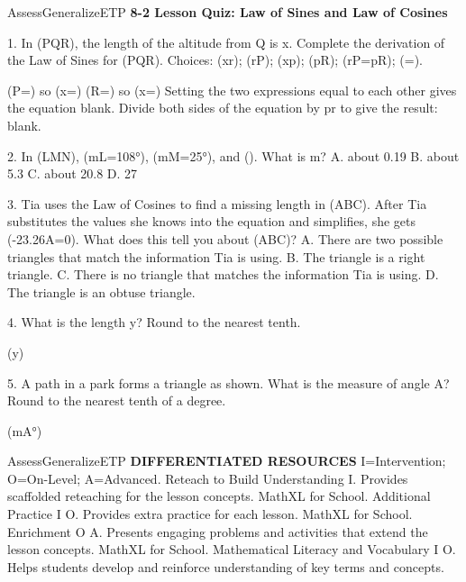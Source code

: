 \documentclass{article}
\newenvironment{te-addendum}[2]{}{}     %
\newcommand{\answer}[1]{}               %
\newcommand{\placeholder}[2]{}          %
\newcommand{\te}[1]{}                   %
\begin{document}
\begin{te-addendum}{Assess}{GeneralizeETP}
\textbf{8-2 Lesson Quiz: Law of Sines and Law of Cosines}
\te{ASSESSMENT RESOURCES. Name blank. enVision Algebra 2. SavvasRealize.com. Copyright© Savvas Learning Company LLC. All Rights Reserved. enVision Algebra 2 Assessment Sourcebook.}
1. In (\triangle PQR), the length of the altitude from Q is x. Complete the derivation of the Law of Sines for (\triangle PQR).
Choices: (\frac xr); (r\sin P); (\frac xp); (p\sin R); (r\sin P=p\sin R); (=).
\placeholder{diagram}{Black triangle PQR, horizontal base P left R right q; Q above near right, PQ r, QR p. Vertical altitude x from Q to base with dashed right-angle square at foot.}
(\sin P=) so (x=)
(\sin R=) so (x=)
Setting the two expressions equal to each other gives the equation blank.
Divide both sides of the equation by pr to give the result: blank.
\answer{1. (\frac xr); (r\sin P); (\frac xp); (p\sin R); (r\sin P=p\sin R); (\frac{\sin P}{p}=\frac{\sin R}{r}).}
2. In (\triangle LMN), (m\angle L=108°), (m\angle M=25°), and (). What is m?
A. about 0.19
B. about 5.3
C. about 20.8
D. 27
\answer{2. B}
3. Tia uses the Law of Cosines to find a missing length in (\triangle ABC). After Tia substitutes the values she knows into the equation and simplifies, she gets (-23.26\cos A=0). What does this tell you about (\triangle ABC)?
A. There are two possible triangles that match the information Tia is using.
B. The triangle is a right triangle.
C. There is no triangle that matches the information Tia is using.
D. The triangle is an obtuse triangle.
\answer{3. B}
4. What is the length y? Round to the nearest tenth.
\placeholder{diagram}{Black triangle XYZ with nearly horizontal upper side XY 10, X left Y right, Z below; ZY 7, XZ y, angle Y 32°.}
(y\approx{})
\answer{4. 5.5}
5. A path in a park forms a triangle as shown. What is the measure of angle A? Round to the nearest tenth of a degree.
\placeholder{diagram}{Black triangle ACB, horizontal base A left B right, C above left of center. AC 72 yd, CB 135 yd, angle C 119°.}
(m\angle A\approx{}°)
\answer{5. 40.7}
\end{te-addendum}
\begin{te-addendum}{Assess}{GeneralizeETP}
\textbf{DIFFERENTIATED RESOURCES}
I=Intervention; O=On-Level; A=Advanced.
Reteach to Build Understanding I. Provides scaffolded reteaching for the lesson concepts. MathXL for School.
Additional Practice I O. Provides extra practice for each lesson. MathXL for School.
Enrichment O A. Presents engaging problems and activities that extend the lesson concepts. MathXL for School.
Mathematical Literacy and Vocabulary I O. Helps students develop and reinforce understanding of key terms and concepts.
\te{Resource sheets each print Name blank, enVision Algebra 2, SavvasRealize.com, lesson title Law of Sines and Law of Cosines, Copyright© Savvas Learning Company LLC. All Rights Reserved., and enVision Algebra 2 Teaching Resources.}
\end{te-addendum}
\end{document}
